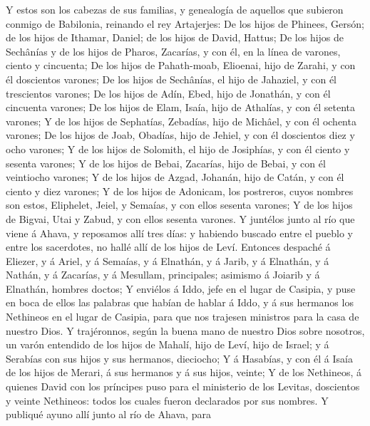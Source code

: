  Y estos son los cabezas de sus familias, y genealogía de
aquellos que subieron conmigo de Babilonia, reinando el rey Artajerjes:
 De los hijos de Phinees, Gersón; de los hijos de Ithamar,
Daniel; de los hijos de David, Hattus;  De los hijos de
Sechânías y de los hijos de Pharos, Zacarías, y con él, en la línea de
varones, ciento y cincuenta;  De los hijos de Pahath-moab,
Elioenai, hijo de Zarahi, y con él doscientos varones;  De
los hijos de Sechânías, el hijo de Jahaziel, y con él trescientos
varones;  De los hijos de Adín, Ebed, hijo de Jonathán, y
con él cincuenta varones;  De los hijos de Elam, Isaía, hijo
de Athalías, y con él setenta varones;  Y de los hijos de
Sephatías, Zebadías, hijo de Michâel, y con él ochenta varones;
 De los hijos de Joab, Obadías, hijo de Jehiel, y con él
doscientos diez y ocho varones;  Y de los hijos de
Solomith, el hijo de Josiphías, y con él ciento y sesenta varones;
 Y de los hijos de Bebai, Zacarías, hijo de Bebai, y con él
veintiocho varones;  Y de los hijos de Azgad, Johanán, hijo
de Catán, y con él ciento y diez varones;  Y de los hijos
de Adonicam, los postreros, cuyos nombres son estos, Eliphelet, Jeiel, y
Semaías, y con ellos sesenta varones;  Y de los hijos de
Bigvai, Utai y Zabud, y con ellos sesenta varones.  Y
juntélos junto al río que viene á Ahava, y reposamos allí tres días: y
habiendo buscado entre el pueblo y entre los sacerdotes, no hallé allí
de los hijos de Leví.  Entonces despaché á Eliezer, y á
Ariel, y á Semaías, y á Elnathán, y á Jarib, y á Elnathán, y á Nathán, y
á Zacarías, y á Mesullam, principales; asimismo á Joiarib y á Elnathán,
hombres doctos;  Y enviélos á Iddo, jefe en el lugar de
Casipia, y puse en boca de ellos las palabras que habían de hablar á
Iddo, y á sus hermanos los Nethineos en el lugar de Casipia, para que
nos trajesen ministros para la casa de nuestro Dios.  Y
trajéronnos, según la buena mano de nuestro Dios sobre nosotros, un
varón entendido de los hijos de Mahalí, hijo de Leví, hijo de Israel; y
á Serabías con sus hijos y sus hermanos, dieciocho;  Y á
Hasabías, y con él á Isaía de los hijos de Merari, á sus hermanos y á
sus hijos, veinte;  Y de los Nethineos, á quienes David con
los príncipes puso para el ministerio de los Levitas, doscientos y
veinte Nethineos: todos los cuales fueron declarados por sus nombres.
 Y publiqué ayuno allí junto al río de Ahava, para
